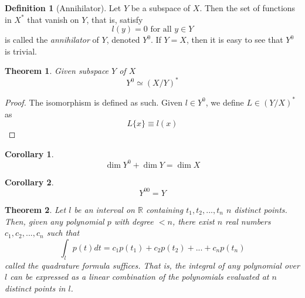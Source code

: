 \documentclass{article}
\newtheorem{theorem}{Theorem}[section]
\newtheorem{corollary}{Corollary}[theorem]
\theoremstyle{remark}
\theoremstyle{definition}
\newtheorem{definition}{Definition}[section]
\begin{document}
\begin{definition}[Annihilator]
Let $Y$ be a subspace of $X$. Then the set of functions in $X^*$ that vanish on $Y$, that is, satisfy
\[l(y) = 0 \text{ for all } y \in Y\]
is called the \textit{annihilator} of $Y$, denoted $Y^0$. If $Y = X$, then it is easy to see that $Y^0$ is trivial. 
\end{definition}

\begin{theorem} Given subspace $Y$ of $X$ 
\[ Y^0 \simeq (X / Y)^*\]
\end{theorem}

\begin{proof}
The isomorphism is defined as such. Given $l \in Y^0$, we define $L \in (Y/X)^*$ as 
\[L\{x\} \equiv l(x)\]
\end{proof}

\begin{corollary}
\[\dim Y^0 + \dim Y = \dim X\]
\end{corollary}

\begin{corollary}
\[Y^{0 0} = Y\]
\end{corollary}

\begin{theorem}
Let $l$ be an interval on $\mathbb{R}$ containing $t_1, t_2, ..., t_n$ $n$ distinct points. Then, given any polynomial $p$ with degree $< n$, there exist $n$ real numbers $c_1, c_2, ..., c_n$ such that
\[ \int_l p(t) d t = c_1 p(t_1) + c_2 p(t_2) + ... + c_n p(t_n)\]
called the \textit{quadrature formula} suffices. That is, the integral of any polynomial over $l$ can be expressed as a linear combination of the polynomials evaluated at $n$ distinct points in $l$. 
\end{theorem}
\end{document}
